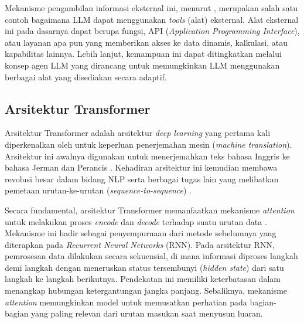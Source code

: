 Mekanisme pengambilan informasi eksternal ini, menurut \textcite{minaeeLargeLanguageModels2025}, merupakan salah satu contoh bagaimana LLM dapat menggunakan \textit{tools} (alat) eksternal. Alat eksternal ini pada dasarnya dapat berupa fungsi, API (\textit{Application Programming Interface}), atau layanan apa pun yang memberikan akses ke data dinamis, kalkulasi, atau kapabilitas lainnya. Lebih lanjut, kemampuan ini dapat ditingkatkan melalui konsep agen LLM yang dirancang untuk memungkinkan LLM menggunakan berbagai alat yang disediakan secara adaptif. 


\subsection{Arsitektur Transformer}
Arsitektur Transformer adalah arsitektur \textit{deep learning} yang pertama kali diperkenalkan oleh \textcite{vaswaniAttentionAllYou2023} untuk keperluan penerjemahan mesin (\textit{machine translation}).
Arsitektur ini awalnya digunakan untuk menerjemahkan teks bahasa Inggris ke bahasa Jerman dan Perancis \parencite{raschkaBuildLargeLanguage2025}. Kehadiran arsitektur ini kemudian membawa revolusi besar dalam bidang NLP serta berbagai tugas lain yang melibatkan pemetaan urutan-ke-urutan (\textit{sequence-to-sequence}) \parencite{altoBuildingLLMPowerd2024}. 

Secara fundamental, arsitektur Transformer memanfaatkan mekanisme \textit{attention} untuk melakukan proses \textit{encode} dan \textit{decode} terhadap suatu urutan data \parencite{altoBuildingLLMPowerd2024}. Mekanisme ini hadir sebagai penyempurnaan dari metode sebelumnya yang diterapkan pada \textit{Recurrent Neural Networks} (RNN). Pada arsitektur RNN, pemrosesan data dilakukan secara sekuensial, di mana informasi diproses langkah demi langkah dengan meneruskan status tersembunyi (\textit{hidden state}) dari satu langkah ke langkah berikutnya. Pendekatan ini memiliki keterbatasan dalam menangkap hubungan ketergantungan jangka panjang. Sebaliknya, mekanisme \textit{attention} memungkinkan model untuk memusatkan perhatian pada bagian-bagian yang paling relevan dari urutan masukan saat menyusun luaran. 

